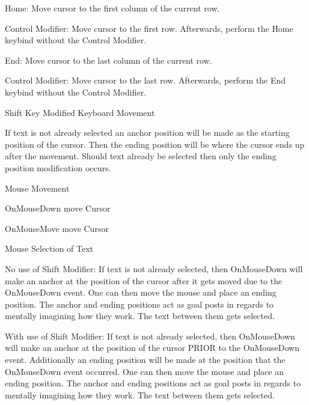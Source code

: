 \begin{DoxyItemize}
\begin{DoxyItemize}
\item {\ttfamily Home}\+: Move cursor to the first column of the current row.
\begin{DoxyItemize}
\item {\ttfamily Control Modifier}\+: Move cursor to the first row. Afterwards, perform the {\ttfamily Home} keybind without the {\ttfamily Control Modifier}.
\end{DoxyItemize}
\item {\ttfamily End}\+: Move cursor to the last column of the current row.
\begin{DoxyItemize}
\item {\ttfamily Control Modifier}\+: Move cursor to the last row. Afterwards, perform the {\ttfamily End} keybind without the {\ttfamily Control Modifier}.
\end{DoxyItemize}
\end{DoxyItemize}
\item {\ttfamily Shift Key} Modified Keyboard Movement
\begin{DoxyItemize}
\item If text is not already selected an anchor position will be made as the starting position of the cursor. Then the ending position will be where the cursor ends up after the movement. Should text already be selected then only the ending position modification occurs.
\end{DoxyItemize}
\item {\ttfamily Mouse Movement}
\begin{DoxyItemize}
\item {\ttfamily On\+Mouse\+Down} move {\ttfamily Cursor}
\item {\ttfamily On\+Mouse\+Move} move {\ttfamily Cursor}
\end{DoxyItemize}
\item {\ttfamily Mouse Selection of Text}
\begin{DoxyItemize}
\item {\ttfamily No use of Shift Modifier}\+: If text is not already selected, then On\+Mouse\+Down will make an anchor at the position of the cursor after it gets moved due to the On\+Mouse\+Down event. One can then move the mouse and place an ending position. The anchor and ending positions act as goal posts in regards to mentally imagining how they work. The text between them gets selected.
\item {\ttfamily With use of Shift Modifier}\+: If text is not already selected, then On\+Mouse\+Down will make an anchor at the position of the cursor PRIOR to the On\+Mouse\+Down event. Additionally an ending position will be made at the position that the On\+Mouse\+Down event occurred. One can then move the mouse and place an ending position. The anchor and ending positions act as goal posts in regards to mentally imagining how they work. The text between them gets selected.

\end{DoxyItemize}
\end{DoxyItemize}
